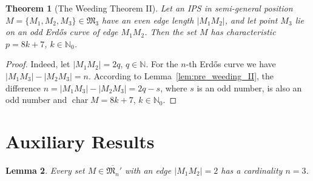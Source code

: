 \documentclass[a4paper,14pt]{article} %
\theoremstyle{plain}
\newtheorem{theorem}{Theorem}[section]
\newtheorem{lemma}[theorem]{Lemma}
\theoremstyle{definition}
\begin{document}
\begin{theorem}[The Weeding Theorem II]
	\label{thm:weeding_II}
	Let an IPS in semi-general position $M=\{M_1, M_2, M_3\}\in{\mathfrak{M}_{3}}$ have an even edge length $|M_1 M_2|$, and let point $M_3$ lie on an odd Erdős curve of edge $M_1 M_2$.
	Then the set $M$ has characteristic $p=8k+7$, $k\in \mathbb{N}_{0}$.
\end{theorem}

\begin{proof}
	Indeed, let $|M_1 M_2|=2q$, $q \in \mathbb{N}$.
	For the $n$-th Erdős curve we have $|M_1 M_3|-|M_2 M_3|=n$.
	According to Lemma~\ref{lem:pre_weeding_II}, the difference $n=|M_1 M_3|-|M_2 M_3|=2q-s$,
	where $s$ is an odd number,
	is also an odd number and $\operatorname{char} M = 8k + 7$, $k\in \mathbb{N}_{0}$.
\end{proof}

\section{Auxiliary Results}

\begin{lemma}
	\label{lem:no_distance_2}
	Every set $M \in \overline{\mathfrak{M}_n}'$ with an edge $|M_1M_2|=2$ has a cardinality $n=3$.
\end{lemma}
\end{document}
